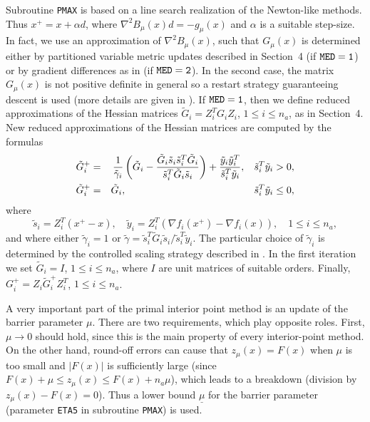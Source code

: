 \documentclass{esub2acm}
\begin{document}
Subroutine {\tt PMAX} is based on a line search realization
of the Newton-like methods. Thus $x^+ = x + \alpha d$, where
$\nabla^2 B_{\mu}(x) d = - g_{\mu}(x)$ and $\alpha$ is a suitable
step-size. In fact, we use an approximation of $\nabla^2 B_{\mu}(x)$,
such that $G_{\mu}(x)$ is determined either by partitioned variable metric updates
described in Section~4 (if ${\tt MED=1}$) or by gradient differences as
in \cite{com1} (if ${\tt MED=2}$). In the second case, the matrix
$G_{\mu}(x)$ is not positive definite in general so a restart strategy
guaranteeing descent is used (more details are given in \cite{lmv2}).
If ${\tt MED=1}$, then we define reduced
approximations of the Hessian matrices $\tilde{G}_i = Z_i^T G_i Z_i$,
$1 \leq i \leq n_a$, as in Section~4. New reduced approximations of the
Hessian matrices are computed by the formulas
%
\begin{eqnarray}
 \tilde{G}_i^+ & = & \frac{1}{\tilde{\gamma}_i}
\left(\tilde{G}_i - \frac{\tilde{G}_i \tilde{s}_i \tilde{s}_i^T
\tilde{G}_i} {\tilde{s}_i^T \tilde{G}_i \tilde{s}_i}\right) +
\frac{\tilde{y}_i \tilde{y}_i^T} {\tilde{s}_i^T \tilde{y}_i},
\hspace{3mm}  \tilde{s}_i^T \tilde{y}_i > 0, \label{6.4} \\
\tilde{G}_i^+ & = & \tilde{G}_i, \hspace{45mm} \tilde{s}_i^T
\tilde{y}_i \leq 0, \nonumber
\end{eqnarray}
%
where
%
$$\tilde{s}_i = Z_i^T (x^+ - x), \quad
\tilde{y}_i = Z_i^T (\nabla f_i(x^+) - \nabla f_i(x)), \quad 1 \leq
i \leq n_a,$$
%
and where either $\tilde{\gamma}_i = 1$ or $\tilde{\gamma} =
\tilde{s}_i^T \tilde{G}_i \tilde{s}_i / \tilde{s}_i^T \tilde{y}_i$.
The particular choice of $\tilde{\gamma}_i$ is determined by the
controlled scaling strategy described in \cite{lus1}. In the first
iteration we set $\tilde{G}_i = I$, $1 \leq i \leq n_a$, where $I$
are unit matrices of suitable orders. Finally,
$G_i^+ = Z_i \tilde{G}_i^+ Z_i^T$, $1 \leq i \leq n_a$.

A very important part of the primal interior point method is an update
of the barrier parameter $\mu$. There are two requirements, which play
opposite roles. First, $\mu \to 0$ should hold, since this is the
main property of every interior-point method. On the other hand,
round-off errors can cause that $z_{\mu}(x) = F(x)$ when $\mu$ is
too small and $|F(x)|$ is sufficiently large (since
$F(x) + \mu \leq z_{\mu}(x) \leq F(x) + n_a \mu$),
which leads to a breakdown (division by $z_{\mu}(x) - F(x) = 0$).
Thus a lower bound $\underline{\mu}$ for the barrier parameter
(parameter {\tt ETA5} in subroutine {\tt PMAX}) is used.
\end{document}
